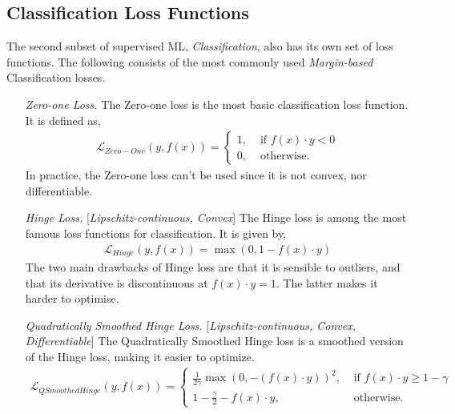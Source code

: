 \documentclass[nobib]{tufte-handout} %
\begin{document}
\subsection{Classification Loss Functions}%
  \label{sub:Classification Loss Functions}
  The second subset of supervised ML, \textit{Classification}, also has its own set of loss functions. The following consists of the most commonly used \textit{Margin-based} Classification losses. 
  \begin{enumerate}
    \item[\it Zero-one Loss.] The Zero-one loss is the most basic classification loss function. It is defined as, 
    \begin{equation}
      \begin{split}
        \mathcal{L}_{Zero-One}(y, f(x)) = 
        \begin{cases}
          1, &\text{ if } f(x) \cdot y < 0 \\ 
          0, &\text{ otherwise.} 
        \end{cases}
      \end{split}
    \end{equation}
    In practice, the Zero-one loss can't be used since it is not convex, nor differentiable.
    \item[\it Hinge Loss.][\textit{Lipschitz-continuous, Convex}] The Hinge loss is among the most famous loss functions for classification. It is given by, 
 \begin{equation}
      \begin{split}
        \mathcal{L}_{Hinge}(y, f(x)) = \max(0, 1-f(x)\cdot y)
      \end{split}
    \end{equation}
    The two main drawbacks of Hinge loss are that it is sensible to outliers, and that its derivative is discontinuous at $f(x)\cdot y = 1$. The latter makes it harder to optimise.
    \item[\it Quadratically Smoothed Hinge Loss.][\textit{Lipschitz-continuous, Convex, Differentiable}] The Quadratically Smoothed Hinge loss is a smoothed version of the Hinge loss, making it easier to optimize.
\begin{equation}
      \begin{split}
        \mathcal{L}_{QSmoothedHinge}(y, f(x)) = 
        \begin{cases}
          \frac{1}{2\gamma} \max(0, -(f(x)\cdot y))^2 , &\text{ if } f(x)\cdot y \geq 1 -\gamma\\
          1 -\frac{\gamma}{2} -f(x)\cdot y, &\text{ otherwise.}  

\end{cases}
\end{split}
\end{equation}
\end{enumerate}
\end{document}
